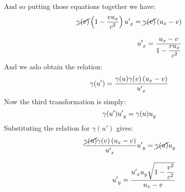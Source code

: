 And so putting those equations together we have:
\begin{equation}
  \begin{split}
    \cancel{\gamma(v)}\brackets{1-\dfrac{v u_x}{c^2}}\tensor{u}{^\prime_x} = \cancel{\gamma(v)}\brackets{u_x - v} \\[8pt]
    \tensor{u}{^\prime_x} = \dfrac{u_x - v}{1-\dfrac{v u_x}{c^2}}
  \end{split}
\end{equation}
And we aslo obtain the relation:
\begin{equation}
  \gamma(u') = \dfrac{\gamma(u)\gamma(v)\brackets{u_x-v}}{\tensor{u}{^\prime_x}}
\end{equation}
Now the third transformation is simply:
\begin{equation}
  \gamma(u')\tensor{u}{^\prime_y} = \gamma(u)\tensor{u}{_y}
\end{equation}
Substituting the relation for $\gamma(u')$ gives:
\begin{equation}
  \begin{split}
    \dfrac{\cancel{\gamma(u)}\gamma(v)\brackets{u_x-v}}{\tensor{u}{^\prime_x}}\tensor{u}{^\prime_y} = \cancel{\gamma(u)}\tensor{u}{_y} \\[8pt]
    \tensor{u}{^\prime_y} = \dfrac{\tensor{u}{^\prime_x} \tensor{u}{_y}\sqrt{1-\dfrac{v^2}{c^2}}}{u_x-v}
  \end{split}
\end{equation}
